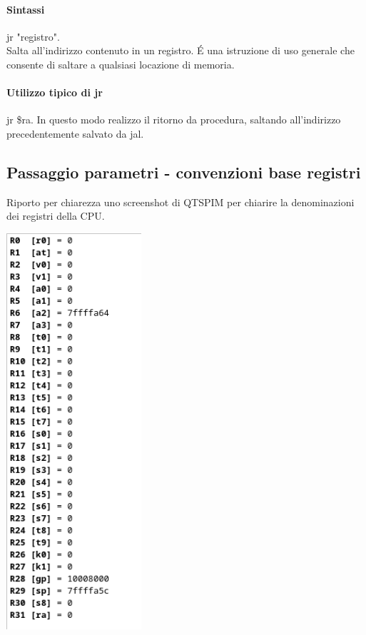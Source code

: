 \documentclass[12pt, a4paper, openany]{book}
\begin{document}
\paragraph*{Sintassi} jr "registro".
\\ Salta all'indirizzo contenuto in un registro. \'E una istruzione di uso generale
che consente di saltare a qualsiasi locazione di memoria.
\paragraph*{Utilizzo tipico di jr} jr \$ra. In questo modo realizzo il ritorno da procedura,
saltando all'indirizzo precedentemente salvato da jal.

\subsection{Passaggio parametri - convenzioni base registri}
Riporto per chiarezza uno screenshot di QTSPIM per chiarire la denominazioni dei registri
della CPU.
\begin{center}
    \includegraphics[width=50mm, scale=0.5]{QTSPIM Reg.png}
\end{center}
\end{document}
